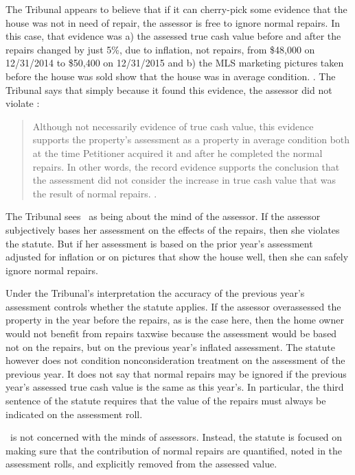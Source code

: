 \documentclass[12pt,\documentclassflag]{michiganCourtOfAppealsBrief}
\begin{document}
The Tribunal appears to believe that if it can cherry-pick some evidence that the house was not in need of repair, the assessor is free to ignore normal repairs.
In this case, that evidence was a) the assessed true cash value before and after the repairs changed by just 5\%, due to inflation, not repairs,
from \$48,000 on 12/31/2014 to \$50,400 on 12/31/2015 and
b) the MLS marketing pictures taken before the house was sold show that the house was in average condition. \reconsiderationDenied[2]. The Tribunal says that simply because it found this evidence, the assessor did not violate \mathieuGast:

\begin{quote}
	Although not necessarily evidence of true cash value, this evidence supports the property's assessment as a property in average condition both at the time Petitioner acquired it and after he completed the normal repairs. In other words, the record evidence supports the conclusion that the assessment did not consider the increase in true cash value that was the result of normal repairs. \reconsiderationDenied[2]. 
\end{quote}
 
The Tribunal sees \mathieuGast\ as being about the mind of the assessor. If the assessor subjectively bases her assessment on the effects of the repairs, then she violates the statute. But if her assessment is based on the prior year's assessment adjusted for inflation or on pictures that show the house well, then she can safely ignore normal repairs.

Under the Tribunal's interpretation the accuracy of the previous year's assessment controls whether the statute applies. If the assessor overassessed the property in the year before the repairs, as is the case here, then the home owner would not benefit from repairs taxwise because the assessment would be based not on the repairs, but on the previous year's inflated assessment. The statute however does not condition nonconsideration treatment on the assessment of the previous year. It does not say that normal repairs may be ignored if the previous year's assessed true cash value is the same as this year's. In particular, the third sentence of the statute requires that the value of the repairs must always be indicated on the assessment roll.

\mathieuGast\ is not concerned with the minds of assessors.
Instead, the statute is focused on making sure that the contribution of normal repairs are quantified, noted in the assessment rolls, and explicitly removed from the assessed value.
\end{document}
